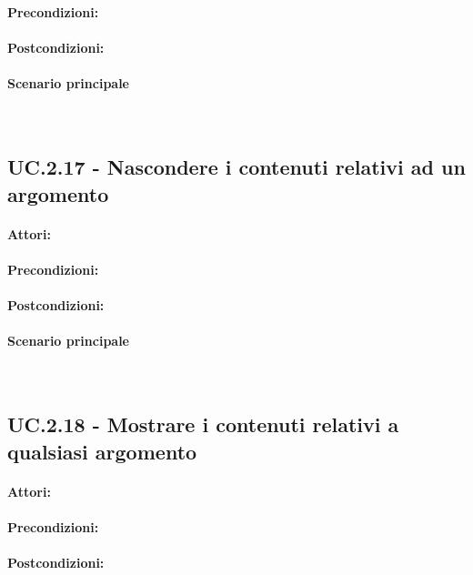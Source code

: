 \documentclass[10pt,a4paper,headinclude,footinclude,hidelinks]{scrreprt} %
\begin{document}
	\paragraph{Precondizioni:}
	\paragraph{Postcondizioni:}
	\paragraph{Scenario principale} \hfill \\

	\subsection[UC.2.17]{UC.2.17 - Nascondere i contenuti relativi ad un argomento}
	\label{ch:stage:ar:uc:2_17}
	\paragraph{Attori:}
	\paragraph{Precondizioni:}
	\paragraph{Postcondizioni:}
	\paragraph{Scenario principale} \hfill \\

	\subsection[UC.2.18]{UC.2.18 - Mostrare i contenuti relativi a qualsiasi argomento}
	\label{ch:stage:ar:uc:2_18}
	\paragraph{Attori:}
	\paragraph{Precondizioni:}
	\paragraph{Postcondizioni:}
\end{document}
